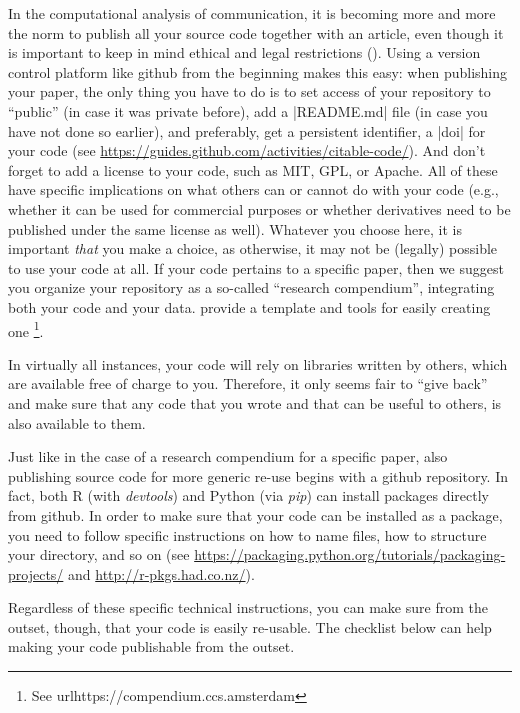 In the computational analysis of communication, it is becoming more and
more the norm to publish all your source code together with an
article, even though it is important to keep in mind ethical and legal
restrictions (\cite{VanAtteveldt2019}). Using a version control
platform like github from the beginning makes this easy: when
publishing your paper, the only thing you have to do is to set access
of your repository to ``public'' (in case it was private before), add
a |README.md| file (in case you have not done so earlier), and
preferably, get a persistent identifier, a |doi| for your
code (see \url{https://guides.github.com/activities/citable-code/}).
And don't forget to add a license to your code, such as MIT, GPL, or
Apache. All of these have specific implications on what others can or
cannot do with your code (e.g., whether it can be used for commercial
purposes or whether derivatives need to be published under the same license as well). Whatever you choose here, it is important \emph{that} you make a choice, as otherwise, it may not be (legally) possible to use
your code at all.
If your code pertains to a specific paper, then we suggest you organize
your repository as a so-called ``research compendium'', integrating
both your code and your data.
\cite{compendium} provide a template and tools for easily creating one%
\footnote{See url{https://compendium.ccs.amsterdam}}.

In virtually all instances, your code will rely on libraries written
by others, which are available free of charge to you. Therefore,
it only seems fair to ``give back'' and make sure that any code that
you wrote and that can be useful to others, is also available to them.

Just like in the case of a research compendium for a specific paper,
also publishing source code for more generic re-use begins with a
github repository. In fact, both R (with \emph{devtools}) and Python
(via \emph{pip}) can install packages directly from github. In order
to make sure that your code can be installed as a package, you
need to follow specific instructions on how to name files, how to
structure your directory, and so on (see \url{https://packaging.python.org/tutorials/packaging-projects/}
and \url{http://r-pkgs.had.co.nz/}).

Regardless of these specific technical instructions, you can make
sure from the outset, though, that your code is easily re-usable.
The checklist below can help making your code publishable from the
outset.

